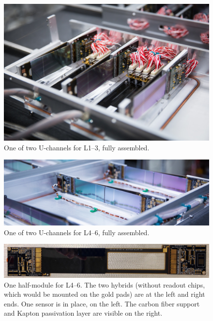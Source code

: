 \begin{figure}[ht]
    \includegraphics[width=\textwidth]{detector/figs/l123}
    \caption{One of two U-channels for L1--3, fully assembled.}
    \label{fig:l123}
\end{figure}

\begin{figure}[ht]
    \includegraphics[width=\textwidth]{detector/figs/l456}
    \caption{One of two U-channels for L4--6, fully assembled.}
    \label{fig:l456}
\end{figure}

\begin{figure}[ht]
    \includegraphics[width=\textwidth]{detector/figs/l456_hm}
    \caption{One half-module for L4--6. The two hybrids (without readout chips, which would be mounted on the gold pads) are at the left and right ends. One sensor is in place, on the left. The carbon fiber support and Kapton passivation layer are visible on the right.}
    \label{fig:l456_hm}
\end{figure}

